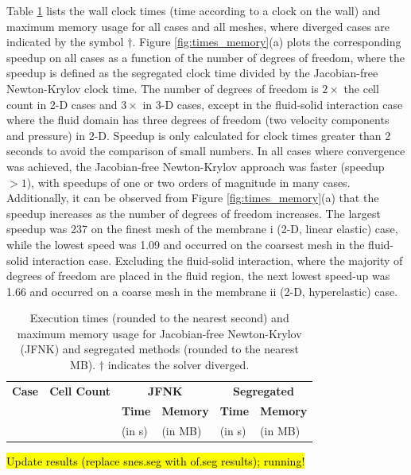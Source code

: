 \documentclass[sn-mathphys,Numbered]{sn-jnl}%
\begin{document}
Table \ref{tab:times_memory} lists the wall clock times (time according to a clock on the wall) and maximum memory usage for all cases and all meshes, where diverged cases are indicated by the symbol $\dag$.
Figure \ref{fig:times_memory}(a) plots the corresponding speedup on all cases as a function of the number of degrees of freedom, where the speedup is defined as the segregated clock time divided by the Jacobian-free Newton-Krylov clock time.
The number of degrees of freedom is $2 \times$ the cell count in 2-D cases and $3 \times$ in 3-D cases, except in the fluid-solid interaction case where the fluid domain has three degrees of freedom (two velocity components and pressure) in 2-D.
Speedup is only calculated for clock times greater than 2 seconds to avoid the comparison of small numbers.
In all cases where convergence was achieved, the Jacobian-free Newton-Krylov approach was faster (speedup $> 1$), with speedups of one or two orders of magnitude in many cases.
Additionally, it can be observed from Figure \ref{fig:times_memory}(a) that the speedup increases as the number of degrees of freedom increases.
The largest speedup was 237 on the finest mesh of the membrane i (2-D, linear elastic) case, while the lowest speed was 1.09 and occurred on the coarsest mesh in the fluid-solid interaction case.
Excluding the fluid-solid interaction, where the majority of degrees of freedom are placed in the fluid region, the next lowest speed-up was 1.66 and occurred on a coarse mesh in the membrane ii (2-D, hyperelastic) case.
\begin{table}[!htbp]
	\centering
		\begin{tabular}{ll|ll|ll}
			\hline
			\textbf{Case} & \textbf{Cell Count} & \multicolumn{2}{c|}{\textbf{JFNK}} & \multicolumn{2}{c}{\textbf{Segregated}} \\
			     &            & \textbf{Time} & \textbf{Memory} & \textbf{Time} & \textbf{Memory} \\
			     &            & (in s) & (in MB) & (in s) & (in MB) \\
			\hline
			
			
			
%			
			
			
			
			
			
%			
			
		\end{tabular}
	\caption{Execution times (rounded to the nearest second) and maximum memory usage for Jacobian-free Newton-Krylov (JFNK) and segregated methods (rounded to the nearest MB). $\dag$ indicates the solver diverged. }
	\label{tab:times_memory}
\end{table}
\hl{Update results (replace snes.seg with of.seg results); running!}
\end{document}
